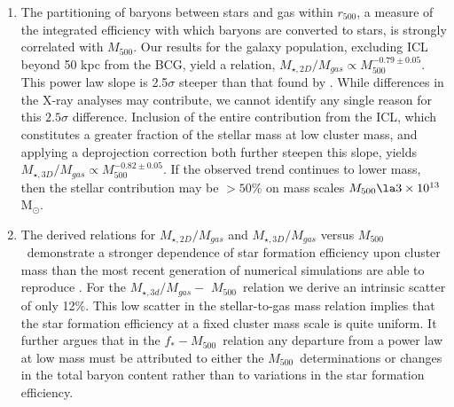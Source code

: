 \documentclass[preprint]{emulateapj}
\newcommand{\msun}{M$_\odot$}
\newcommand\rfive{$r_{500}$}
\newcommand\mfive{${M}_{500}$}
\begin{document}
\begin{enumerate}
\item{The partitioning of baryons between stars and gas within \rfive,
    a measure of the integrated efficiency with which baryons are
    converted to stars,  
    is strongly correlated with \mfive. Our results for the galaxy
    population, excluding ICL beyond 50 kpc from the BCG, yield a
    relation, $M_{\star,2D}/M_{gas}\propto
    M_{500}^{-0.79\pm0.05}$. This power law slope is 2.5$\sigma$ steeper
    than that found by \citet{zhang2011}. While differences in the
    X-ray analyses may contribute, we cannot identify any single
    reason for this $2.5\sigma$ difference. Inclusion of the entire
    contribution from the ICL, which constitutes a greater fraction of
    the stellar mass at low cluster mass, and applying a deprojection
    correction both further steepen this slope, yields
    $M_{\star,3D}/M_{gas}\propto M_{500}^{-0.82\pm 0.05}$. If the
    observed trend continues to lower mass, then
    the stellar contribution may be $>50$\% on mass scales $M_{500}\la
    3\times10^{13}$ \msun.}

\item{The derived relations for $M_{\star,2D}/M_{gas}$ and
    $M_{\star,3D}/M_{gas}$ versus \mfive\ 
    demonstrate a stronger dependence of star formation
    efficiency upon cluster mass than the most recent generation of
    numerical simulations are able to reproduce
    \citep[e.g.,][]{puchwein2010,young2011}. 
    For the $M_{\star,3d}/M_{gas} -$ \mfive\ relation we
    derive an intrinsic scatter of only 12\%.
    This low scatter in the stellar-to-gas mass relation implies
    that the star formation efficiency at a fixed cluster mass scale is quite  
    uniform. It further argues that in
    the $f_*-$\mfive\ relation any departure from a power law at low mass
    must be attributed to either the \mfive\ determinations or changes in
    the total baryon content
    rather than to variations in the star formation efficiency.
    }


\end{enumerate}
\end{document}
